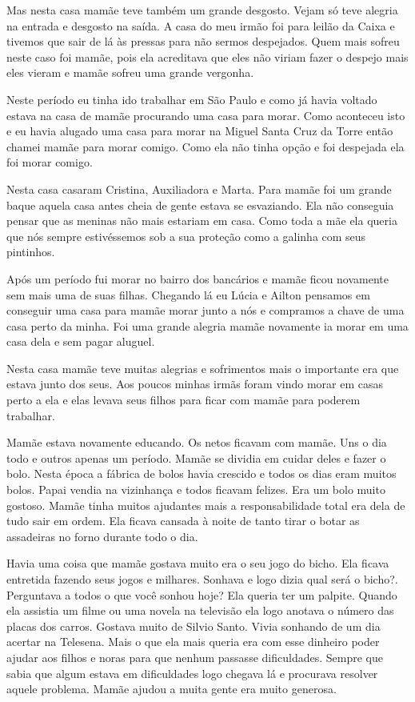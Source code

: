 \documentclass[
  brazil,
  a6paper,
  oneside,
  landscape,
  14pt]{scrbook}
\begin{document}
Mas nesta casa mamãe teve também um grande desgosto. Vejam só teve
alegria na entrada e desgosto na saída. A casa do meu irmão foi para
leilão da Caixa e tivemos que sair de lá às pressas para não sermos
despejados. Quem mais sofreu neste caso foi mamãe, pois ela acreditava
que eles não viriam fazer o despejo mais eles vieram e mamãe sofreu uma
grande vergonha.

Neste período eu tinha ido trabalhar em São Paulo e como já havia
voltado estava na casa de mamãe procurando uma casa para morar. Como
aconteceu isto e eu havia alugado uma casa para morar na Miguel Santa
Cruz da Torre então chamei mamãe para morar comigo. Como ela não tinha
opção e foi despejada ela foi morar comigo.

Nesta casa casaram Cristina, Auxiliadora e Marta. Para mamãe foi um
grande baque aquela casa antes cheia de gente estava se esvaziando. Ela
não conseguia pensar que as meninas não mais estariam em casa. Como toda
a mãe ela queria que nós sempre estivéssemos sob a sua proteção como a
galinha com seus pintinhos.

Após um período fui morar no bairro dos bancários e mamãe ficou
novamente sem mais uma de suas filhas. Chegando lá eu Lúcia e Ailton
pensamos em conseguir uma casa para mamãe morar junto a nós e compramos
a chave de uma casa perto da minha. Foi uma grande alegria mamãe
novamente ia morar em uma casa dela e sem pagar aluguel.

Nesta casa mamãe teve muitas alegrias e sofrimentos mais o importante
era que estava junto dos seus. Aos poucos minhas irmãs foram vindo morar
em casas perto a ela e elas levava seus filhos para ficar com mamãe para
poderem trabalhar.

Mamãe estava novamente educando. Os netos ficavam com mamãe. Uns o dia
todo e outros apenas um período. Mamãe se dividia em cuidar deles e
fazer o bolo. Nesta época a fábrica de bolos havia crescido e todos os
dias eram muitos bolos. Papai vendia na vizinhança e todos ficavam
felizes. Era um bolo muito gostoso. Mamãe tinha muitos ajudantes mais a
responsabilidade total era dela de tudo sair em ordem. Ela ficava
cansada à noite de tanto tirar o botar as assadeiras no forno durante
todo o dia.

Havia uma coisa que mamãe gostava muito era o seu jogo do bicho. Ela
ficava entretida fazendo seus jogos e milhares. Sonhava e logo dizia
qual será o bicho?. Perguntava a todos o que você sonhou hoje? Ela
queria ter um palpite. Quando ela assistia um filme ou uma novela na
televisão ela logo anotava o número das placas dos carros. Gostava muito
de Silvio Santo. Vivia sonhando de um dia acertar na Telesena. Mais o
que ela mais queria era com esse dinheiro poder ajudar aos filhos e
noras para que nenhum passasse dificuldades. Sempre que sabia que algum
estava em dificuldades logo chegava lá e procurava resolver aquele
problema. Mamãe ajudou a muita gente era muito generosa.
\end{document}
